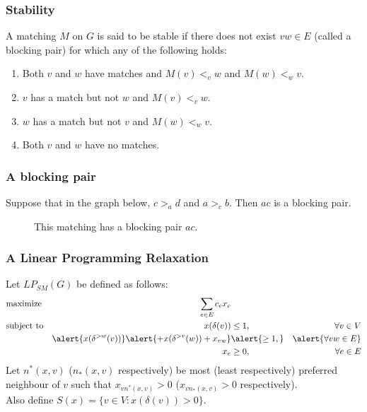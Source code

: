 \documentclass{beamer}
\begin{document}
\begin{frame}
\frametitle{Stability}
A matching $M$ on $G$ is said to be stable if there does not exist $vw \in E$ (called a blocking pair) for which any of the following holds:
\begin{enumerate}
\item Both $v$ and $w$ have matches and $M(v) <_v w$ and $M(w) <_w v$.
\item $v$ has a match but not $w$ and $M(v) <_v w$.
\item $w$ has a match but not $v$ and $M(w) <_w v$.
\item Both $v$ and $w$ have no matches.
\end{enumerate}
\end{frame}

\begin{frame}
\frametitle{A blocking pair}
Suppose that in the graph below, $c >_a d$ and $a >_c b$. Then $ac$ is a blocking pair.
\begin{figure}
\centering
{}
\caption{This matching has a blocking pair $ac$.}
\end{figure}
\end{frame}

\begin{frame}
\frametitle{A Linear Programming Relaxation}
Let $LP_{SM}(G)$ be defined as follows:
\begin{align*}
&\text{maximize} &\sum_{e \in E} c_e x_e \\
&\text{subject to} &x(\delta(v)) &\leq 1, &\forall v \in V\\
& &\alert{x(\delta^{>w}(v))} \alert{+ x(\delta^{>v}(w)) + x_{vw}} &\alert{\geq 1,} &\alert{\forall vw \in E}\\
& &x_e &\geq 0, &\forall e \in E
\end{align*}
Let $n^*(x,v)$ ($n_*(x,v)$ respectively) be most (least respectively) preferred neighbour of $v$ such that $x_{vn^*(x,v)} > 0$ ($x_{vn_*(x,v)} > 0$ respectively). \\
Also define $S(x) = \{ v \in V : x(\delta(v)) > 0 \}$.
\end{frame}
\end{document}
